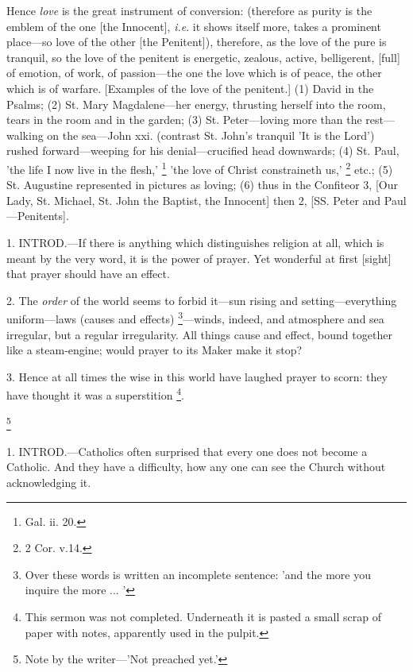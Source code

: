 Hence \emph{love} is the great instrument of
conversion: (therefore as purity is the emblem of the one [the
Innocent], \emph{i.e}. it shows itself more, takes a prominent
place—so love of the other [the Penitent]), therefore, as the love
of the pure is tranquil, so the love of the penitent is energetic,
zealous, active, belligerent, [full] of emotion, of work, of
passion—the one the love which is of peace, the other which is of
warfare. [Examples of the love of the penitent.] (1) David in the
Psalms; (2) St. Mary Magdalene—her energy, thrusting herself
into the room, tears in the room and in the garden; (3) St.
Peter—loving more than the rest—walking on the sea—John xxi.
(contrast St. John's tranquil 'It is the Lord') rushed
forward—weeping for his denial—crucified head downwards; (4) St.
Paul, 'the life I now live in the flesh,' \footnote{Gal. ii. 20.} 'the love of Christ constraineth us,' \footnote{2 Cor. v.14.} etc.; (5) St. Augustine represented in pictures as loving; (6)
thus in the Confiteor 3, [Our Lady, St. Michael, St. John the Baptist,
the Innocent] then 2, [SS. Peter and Paul—Penitents].


1. INTROD.—If
there is anything which distinguishes religion at all, which is meant
by the very word, it is the power of prayer. Yet wonderful at first
[sight] that prayer should have an effect.

2. The \emph{order} of the world seems to forbid
it—sun rising and setting—everything uniform—laws (causes and
effects) \footnote{Over these words is
written an incomplete sentence: 'and the more you inquire the more ...
'}—winds, indeed,
and atmosphere and sea irregular, but a regular irregularity. All
things cause and effect, bound together like a steam-engine; would
prayer to its Maker make it stop?

3. Hence at all times the wise in this world have
laughed prayer to scorn: they have thought it was a superstition \footnote{This sermon was not
completed. Underneath it is pasted a small scrap of paper with notes,
apparently used in the pulpit.}.


\footnote{Note by the writer—'Not
preached yet.'}

1. INTROD.—Catholics
often surprised that every one does not become a Catholic. And they
have a difficulty, how any one can see the Church without
acknowledging it.

